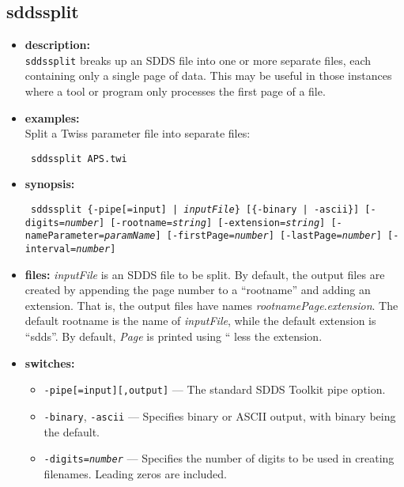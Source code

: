 \newpage
\subsection{sddssplit}
\label{sddssplit}

\begin{itemize}
\item {\bf description:} \hspace*{1mm}\\
{\tt sddssplit} breaks up an SDDS file into one or more separate files, each containing only a single
page of data.  This may be useful in those instances where a tool or program only processes the first
page of a file.
\item {\bf examples:} \\
Split a Twiss parameter file into separate files:
\begin{flushleft}{\tt
sddssplit APS.twi
}\end{flushleft}
\item {\bf synopsis:} \\
\begin{flushleft}{\tt
sddssplit \{-pipe[=input] | {\em inputFile}\}  [\{-binary | -ascii\}] 
[-digits={\em number}] [-rootname={\em string}] [-extension={\em string}]
[-nameParameter={\em paramName}]
[-firstPage={\em number}] [-lastPage={\em number}] [-interval={\em number}] 
}\end{flushleft}
\item {\bf files:}
{\em inputFile} is an SDDS file to be split.  By default, the output files are created by appending the page number
to a ``rootname'' and adding an extension.  That is, the output files have names 
{\em rootname}{\em Page}.{\em extension}.  The default rootname is the name of {\em inputFile}, while
the default extension is ``sdds''.  By default, {\em Page} is printed using ``%
less the extension.  
\item {\bf switches:}
    \begin{itemize}
    \item {\tt -pipe[=input][,output]} --- The standard SDDS Toolkit pipe option.
    \item {\tt -binary}, {\tt -ascii} --- Specifies binary or ASCII output, with binary being the default.
    \item {\tt -digits={\em number}} --- Specifies the number of digits to be used in creating filenames.
        Leading zeros are included.

\end{itemize}
\end{itemize}

